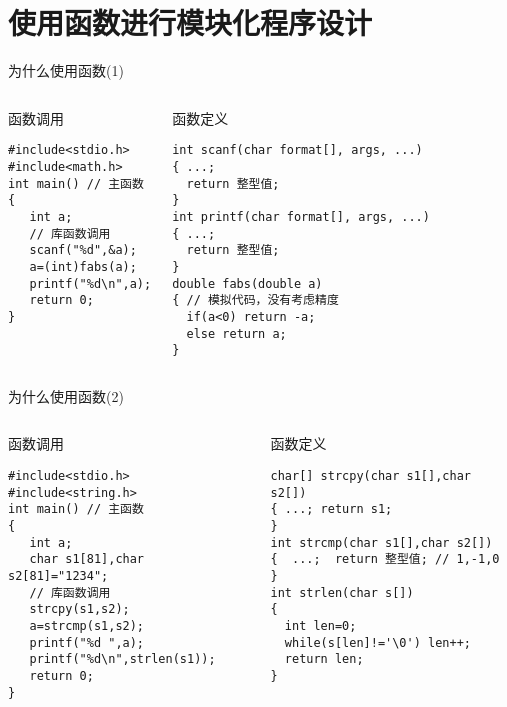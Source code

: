 
\section{使用函数进行模块化程序设计}

\begin{frame}{为什么使用函数(1)}
\tiny
\vspace{-0.2cm}
\begin{columns}[T]
\begin{beamerboxesrounded}{函数调用}
\begin{lstlisting}
#include<stdio.h>
#include<math.h>
int main() // 主函数
{
   int a;
   // 库函数调用
   scanf("%d",&a); 
   a=(int)fabs(a); 
   printf("%d\n",a);
   return 0; 
}
\end{lstlisting}
\end{beamerboxesrounded}
\begin{beamerboxesrounded}{函数定义}
\begin{lstlisting}
int scanf(char format[], args, ...)
{ ...;
  return 整型值;
}
int printf(char format[], args, ...)
{ ...;
  return 整型值;
}
double fabs(double a)
{ // 模拟代码，没有考虑精度
  if(a<0) return -a;
  else return a;
}
\end{lstlisting}
\end{beamerboxesrounded}
\end{columns}
\end{frame}

\begin{frame}{为什么使用函数(2)}
\tiny
\vspace{-0.2cm}
\begin{columns}[T]
\begin{beamerboxesrounded}{函数调用}
\begin{lstlisting}
#include<stdio.h>
#include<string.h>
int main() // 主函数
{
   int a;
   char s1[81],char s2[81]="1234";
   // 库函数调用 
   strcpy(s1,s2); 
   a=strcmp(s1,s2);
   printf("%d ",a);
   printf("%d\n",strlen(s1));
   return 0; 
}
\end{lstlisting}
\end{beamerboxesrounded}
\begin{beamerboxesrounded}{函数定义}
\begin{lstlisting}
char[] strcpy(char s1[],char s2[])
{ ...; return s1; 
}
int strcmp(char s1[],char s2[])
{  ...;  return 整型值; // 1,-1,0
}
int strlen(char s[])
{
  int len=0;
  while(s[len]!='\0') len++;
  return len;
}
\end{lstlisting}
\end{beamerboxesrounded}
\end{columns}
\end{frame}

